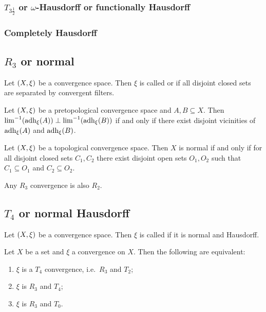 \subsubsection{$T_{3\frac{1}{2}}$ or $\omega$-Hausdorff or functionally Hausdorff}


\subsubsection{Completely Hausdorff}

\subsection{$R_3$ or normal}
\begin{definition}
Let $\sSet{X,\xi}$ be a convergence space. Then $\xi$ is called  or  if all disjoint closed sets are separated by convergent filters.
\end{definition}

\begin{proposition}
Let $\sSet{X,\xi}$ be a pretopological convergence space and $A,B\subseteq X$. Then $\lim^{-1}(\operatorname{adh}_\xi(A)) \perp \lim^{-1}(\operatorname{adh}_\xi(B))$ \textup{if and only if} there exist disjoint vicinities of $\operatorname{adh}_\xi(A)$ and $\operatorname{adh}_\xi(B)$.
\end{proposition}


\begin{proposition} \label{topologicalNormal}
Let $\sSet{X,\xi}$ be a topological convergence space. Then $X$ is normal \textup{if and only if} for all disjoint closed sets $C_1, C_2$ there exist disjoint open sets $O_1,O_2$ such that $C_1\subseteq O_1$ and $C_2\subseteq O_2$.
\end{proposition}

\begin{proposition}
Any $R_3$ convergence is also $R_2$.
\end{proposition}


\subsection{$T_4$ or normal Hausdorff}
\begin{definition}
Let $\sSet{X,\xi}$ be a convergence space. Then $\xi$ is called  if it is normal and Hausdorff.
\end{definition}

\begin{proposition}
Let $X$ be a set and $\xi$ a convergence on $X$. Then the following are equivalent:
\begin{enumerate}
\item $\xi$ is a $T_4$ convergence, i.e.\ $R_3$ and $T_2$;
\item $\xi$ is $R_3$ and $T_4$;
\item $\xi$ is $R_3$ and $T_0$.
\end{enumerate}
\end{proposition}


